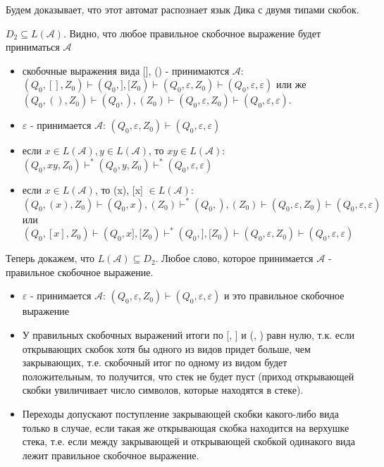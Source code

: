 \documentclass[a4paper,14pt]{article} %
\begin{document}
Будем доказывает, что этот автомат распознает язык Дика с двумя типами скобок.

$D_2 \subseteq L(\mathcal{A})$. Видно, что любое правильное скобочное выражение будет приниматься $\mathcal{A}$
\begin{itemize}
    \item скобочные выражения вида [], () - принимаются $\mathcal{A}$: $(Q_0, [], Z_0) \vdash (Q_0, ], [Z_0) \vdash (Q_0, \varepsilon, Z_0) \vdash (Q_0, \varepsilon, \varepsilon)$
    или же $(Q_0, (), Z_0) \vdash (Q_0, ), (Z_0) \vdash (Q_0, \varepsilon, Z_0) \vdash (Q_0, \varepsilon, \varepsilon)$.
    \item $\varepsilon$ - принимается $\mathcal{A}$: $(Q_0, \varepsilon, Z_0) \vdash (Q_0, \varepsilon, \varepsilon)$
    \item если $x \in L(\mathcal{A}), y \in L(\mathcal{A})$, то $xy \in L(\mathcal{A})$: $(Q_0, xy, Z_0) \vdash^* (Q_0, y, Z_0) \vdash^* (Q_0, \varepsilon, \varepsilon)$
    \item если $x \in L(\mathcal{A})$, то (x), [x] $\in L(\mathcal{A})$: $(Q_0, (x), Z_0) \vdash (Q_0, x), (Z_0) \vdash^* (Q_0, ), (Z_0) \vdash (Q_0, \varepsilon, Z_0) \vdash (Q_0, \varepsilon, \varepsilon)$
    или $(Q_0, [x], Z_0) \vdash (Q_0, x], [Z_0) \vdash^* (Q_0, ], [Z_0) \vdash (Q_0, \varepsilon, Z_0) \vdash (Q_0, \varepsilon, \varepsilon)$
\end{itemize}

Теперь докажем, что $L(\mathcal{A}) \subseteq D_2$. Любое слово, которое принимается $\mathcal{A}$ - правильное скобочное выражение.
\begin{itemize}
    \item $\varepsilon$ - принимается $\mathcal{A}$: $(Q_0, \varepsilon, Z_0) \vdash (Q_0, \varepsilon, \varepsilon)$ и это правильное скобочное выражение
    \item У правильных скобочных выражений итоги по [, ] и (, ) равн нулю, т.к. если открывающих скобок хотя бы одного из видов придет больше, чем закрывающих, т.е. скобочный итог по одному из видом будет положительным, то получится, что стек не будет пуст (приход открывающей скобки увиличивает число символов, которые находятся в стеке).
    \item Переходы допускают поступление закрывающей скобки какого-либо вида только в случае, если такая же открывающая скобка находится на верхушке стека, т.е. если между закрывающей и открывающей скобкой одинакого вида лежит правильное скобочное выражение.
\end{itemize}
\end{document}
